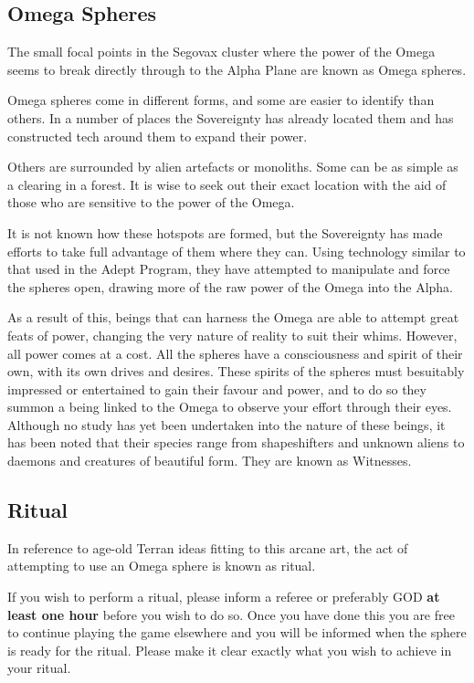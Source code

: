 \documentclass{scrbook}
\begin{document}
\subsection{Omega Spheres}

The small focal points in the Segovax cluster where the power of the Omega seems to break directly through to the Alpha Plane are known as Omega spheres.

Omega spheres come in different forms, and some are easier to identify than others. In a number of places the Sovereignty has already located them and has constructed tech around them to expand their power.

Others are surrounded by alien artefacts or monoliths. Some can be as simple as a clearing in a forest. It is wise to seek out their exact location with the aid of those who are sensitive to the power of the Omega.

It is not known how these hotspots are formed, but the Sovereignty has made efforts to take full advantage of them where they can. Using technology similar to that used in the Adept Program, they have attempted to manipulate and force the spheres open, drawing more of the raw power of the Omega into the Alpha.

As a result of this, beings that can harness the Omega are able to attempt great feats of power, changing the very nature of reality to suit their whims. However, all power comes at a cost. All the spheres have a consciousness and spirit of their own, with its own drives and desires. These spirits of the spheres must besuitably impressed or entertained to gain their favour and power, and to do so they summon a being linked to the Omega to observe your effort through their eyes. Although no study has yet been undertaken into the nature of these beings, it has been noted that their species range from shapeshifters and unknown aliens to daemons and creatures of beautiful form. They are known as Witnesses.

\subsection{Ritual}

In reference to age-old Terran ideas fitting to this arcane art, the act of attempting to use an Omega sphere is known as ritual.

If you wish to perform a ritual, please inform a referee or preferably GOD \textbf{at least one hour} before you wish to do so. Once you have done this you are free to continue playing the game elsewhere and you will be informed when the sphere is ready for the ritual. Please make it clear exactly what you wish to achieve in your ritual.
\end{document}
